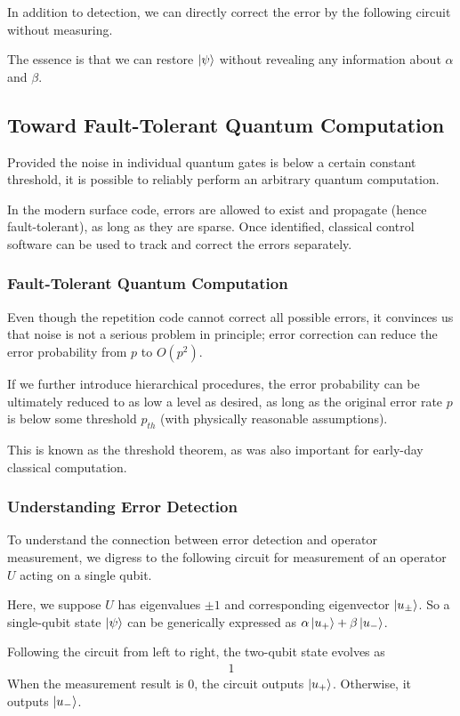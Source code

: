 In addition to detection, we can directly correct the error by the following circuit without measuring.

The essence is that we can restore $\ket{\psi}$ without revealing any information about $\alpha$ and $\beta$.


\subsection{Toward Fault-Tolerant Quantum Computation}
Provided the noise in individual quantum gates is below a certain constant threshold, it is possible to reliably perform an arbitrary quantum computation.

In the modern surface code, errors are allowed to exist and propagate (hence fault-tolerant), as long as they are sparse. Once identiﬁed, classical control software can be used to track and correct the errors separately.

\subsubsection{Fault-Tolerant Quantum Computation}
Even though the repetition code cannot correct all possible errors, it convinces us that noise is not a serious problem in principle; error correction can reduce the error probability from $p$ to $O(p^2)$. 

If we further introduce hierarchical procedures, the error probability can be ultimately reduced to as low a level as desired, as long as the original error rate $p$ is below some threshold $p_{th}$ (with physically reasonable assumptions).

This is known as the threshold theorem, as was also important for early-day classical computation.

\subsubsection{Understanding Error Detection}
To understand the connection between error detection and operator measurement, we digress to the following circuit for measurement of an operator $U$ acting on a single qubit.

Here, we suppose $U$ has eigenvalues $\pm 1$ and corresponding eigenvector $\ket{u_\pm}$. So a single-qubit state $\ket{\psi}$ can be generically expressed as $\alpha\ket{u_+}+\beta\ket{u_-}$. 

Following the circuit from left to right, the two-qubit state evolves as
\begin{align*}
    1
\end{align*}
When the measurement result is 0, the circuit outputs $\ket{u_+}$. Otherwise, it outputs $\ket{u_-}$. 

